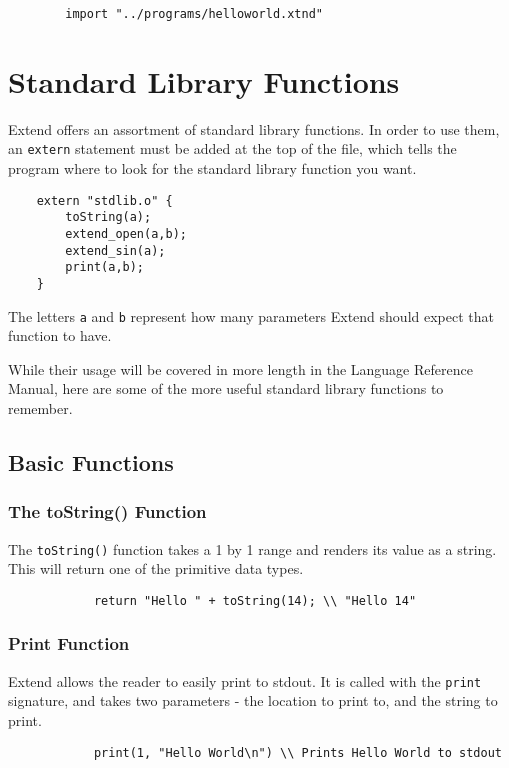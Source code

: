 	\begin{lstlisting}
		import "../programs/helloworld.xtnd"
	\end{lstlisting}

\section{Standard Library Functions}
Extend offers an assortment of standard library functions. In order to use them, an \texttt{extern} statement must be added at the top of the file, which tells the program where to look for the standard library function you want.

\begin{lstlisting}
	extern "stdlib.o" {
		toString(a);
		extend_open(a,b);
		extend_sin(a);
		print(a,b);
	}
\end{lstlisting}

\medskip \noindent
The letters \texttt{a} and \texttt{b} represent how many parameters Extend should expect that function to have.

While their usage will be covered in more length in the Language Reference Manual, here are some of the more useful standard library functions to remember.
	\subsection{Basic Functions}
		\subsubsection{The toString() Function}
		The \texttt{toString()} function takes a 1 by 1 range and renders its value as a string. This will return one of the primitive data types.

		\begin{lstlisting}
			return "Hello " + toString(14); \\ "Hello 14"
		\end{lstlisting}

		\subsubsection{Print Function}
		Extend allows the reader to easily print to stdout. It is called with the \texttt{print} signature, and takes two parameters - the location to print to, and the string to print.

		\begin{lstlisting}
			print(1, "Hello World\n") \\ Prints Hello World to stdout
		\end{lstlisting}

